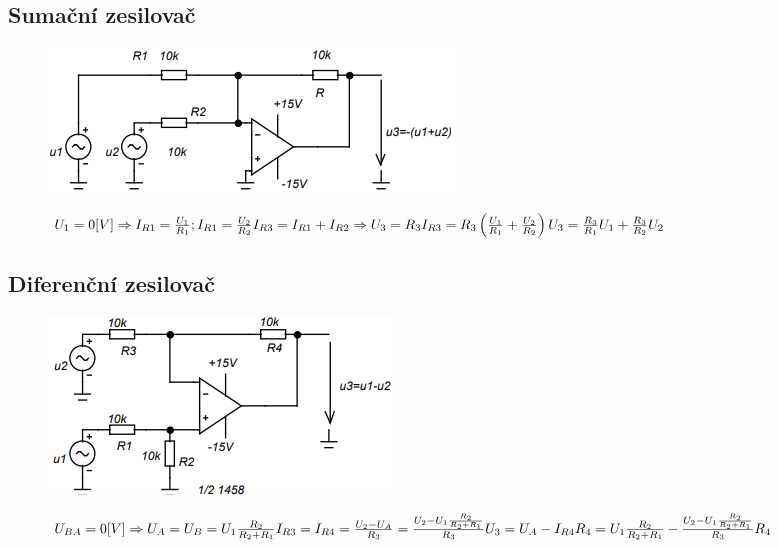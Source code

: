 \documentclass{article}
\begin{document}
\subsection*{Sumační zesilovač}
\begin{figure}[H]
  \begin{minipage}[t]{0.48\textwidth}
    \includegraphics[width=\textwidth]{uvod/sou.png}
  \end{minipage}
  \hfill
  \begin{minipage}[t]{0.48\textwidth}
    \vspace{-20mm}
    \(
      U_{1} = 0\-[V] \Rightarrow I_{R1} = \frac{U_1}{R_1} ; I_{R1} = \frac{U_2}{R_2}

      I_{R3} = I_{R1} + I_{R2} \Rightarrow U_3 = R_3 I_{R3} = R_3\left(\frac{U_1}{R_1} + \frac{U_2}{R_2}\right) \\ U_3 = \frac{R_3}{R_1} U_1 + \frac{R_3}{R_2} U_2
    \)
  \end{minipage}
\end{figure}

\subsection*{Diferenční zesilovač}
\begin{figure}[H]
  \begin{minipage}[t]{0.48\textwidth}
    \includegraphics[width=\textwidth]{uvod/odc.png}
  \end{minipage}
  \hfill
  \begin{minipage}[t]{0.48\textwidth}
    \vspace{-35mm}
    \(
      U_{BA} = 0\-[V] \Rightarrow U_A = U_B = U_1 \frac{R_2}{R_2+R_1}

      I_{R3} = I_{R4} = \frac{U_2-U_A}{R_3} = \frac{U_2-U_1\frac{R_2}{R_2+R_1}}{R_3}

      U_3 = U_A - I_{R4}R_4 = U_1 \frac{R_2}{R_2+R_1} - \frac{U_2-U_1\frac{R_2}{R_2+R_1}}{R_3}R_4
    \)
  \end{minipage}
\end{figure}
\end{document}

